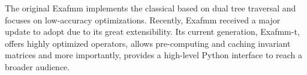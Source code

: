 The original Exafmm \cite{yokota2012tuned,yokota2013fmm} implements the classical \fmm based on dual tree traversal and focuses on low-accuracy optimizations.
Recently, Exafmm received a major update to adopt \kifmm due to its great extensibility.
Its current generation, Exafmm-t, offers highly optimized \kifmm operators, allows pre-computing and caching invariant matrices and more importantly, provides a high-level Python interface to reach a broader audience.